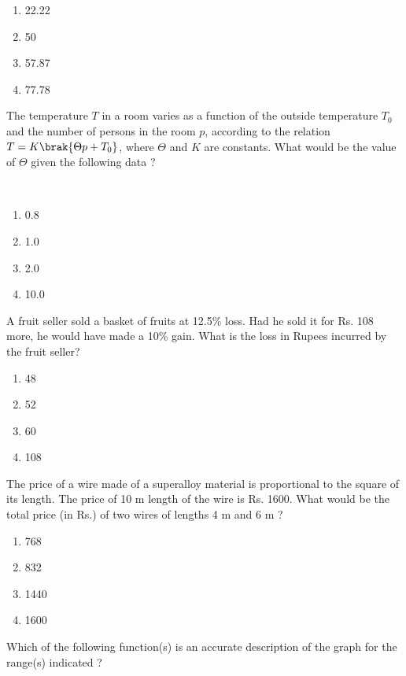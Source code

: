 \begin{enumerate}
    \item 22.22
    \item 50
    \item 57.87
    \item 77.78 \\
\end{enumerate}
\item The temperature $T$ in a room varies as a function of the outside temperature $T_0$ and the number of persons in the room $p$, according to the relation $T = K \brak{\Theta p + T_0}$, where $\Theta$ and $K$ are constants. What would be the value of $\Theta$ given the following data ?
\begin{table}[h!]
  \centering
  
 \end{table}\\
 \begin{enumerate}
    \item 0.8
    \item 1.0
    \item 2.0
    \item 10.0 \\
\end{enumerate}
\item A fruit seller sold a basket of fruits at 12.5\% loss. Had he sold it for Rs. 108 more, he would have made a 10\% gain. What is the loss in Rupees incurred by the fruit seller?
\begin{enumerate}
    \item 48
    \item 52
     \item 60
    \item 108 \\
\end{enumerate}
\item The price of a wire made of a superalloy material is proportional to the square of its length. The price of 10 m length of the wire is Rs. 1600. What would be the total price (in Rs.) of two wires of lengths 4 m and 6 m ?
\begin{enumerate}
    \item 768
    \item 832
    \item 1440
    \item 1600 \\
\end{enumerate}
\item Which of the following function(s) is an accurate description of the graph for the range(s) indicated ?
